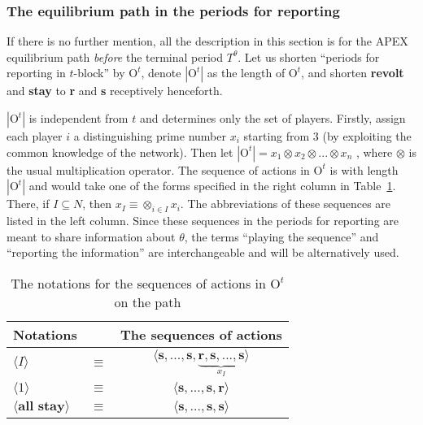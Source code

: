 \documentclass[12pt,letter]{article}
\newcommand{\Omicron}{\mathrm{O}}
\theoremstyle{definition}
\theoremstyle{remark}
\theoremstyle{claim}
\begin{document}
\subsubsection{The equilibrium path in the periods for reporting}
\label{sec:eq_rp}
If there is no further mention, all the description in this section is for the APEX equilibrium path \textit{before} the terminal period $T^{\theta}$. Let us shorten ``periods for reporting in $t$-block'' by $\Omicron^{t}$, denote $|\Omicron^t|$ as the length of $\Omicron^{t}$, and shorten \textbf{revolt} and \textbf{stay} to \textbf{r} and \textbf{s} receptively henceforth. 

$|\Omicron^{t}|$ is independent from $t$ and determines only the set of players. Firstly, assign each player $i$ a distinguishing prime number $x_i$ starting from $3$ (by exploiting the common knowledge of the network). Then let $|\Omicron^{t}|=x_1\otimes x_2\otimes...\otimes x_n$ , where $\otimes$ is the usual multiplication operator. The sequence of actions in $\Omicron^{t}$ is with length $|\Omicron^t|$ and would take one of the forms specified in the right column in Table~\ref{Table_msg_form}. There, if $I\subseteq N$, then $x_{I}\equiv \otimes_{i\in I}x_i$. The abbreviations of these sequences are listed in the left column. Since these sequences in the periods for reporting are meant to share information about $\theta$, the terms ``playing the sequence'' and ``reporting the information'' are interchangeable and will be alternatively used.


\begin{table}[!htbp]
\caption{The notations for the sequences of actions in $\Omicron^t$ on the path}
\label{Table_msg_form}
\begin{center}
\begin{tabular}{l c c}
Notations && The sequences of actions\\
\hline
\hline
$\langle  I \rangle$ 				& $\equiv$ 			& $\langle \textbf{s},...,\textbf{s},\underbrace{\textbf{r},\textbf{s},...,\textbf{s}}_{x_{I}} \rangle$  \\
$\langle 1 \rangle$	 					& $\equiv$ 			& $\langle \textbf{s},...,\textbf{s},{\textbf{r}}\rangle$  \\
$\langle \textbf{all stay} \rangle$	 					& $\equiv$ 			& $\langle \textbf{s},...,\textbf{s},{\textbf{s}}\rangle$  \\
\hline
\end{tabular}
\end{center}
\end{table}
\end{document}

